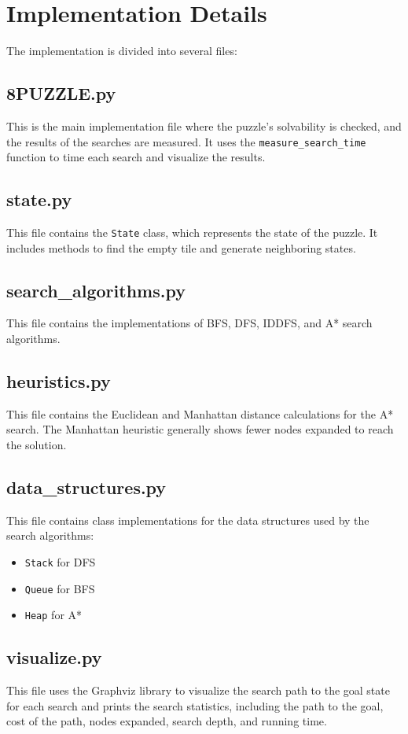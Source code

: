 \documentclass{article}
\begin{document}
\section{Implementation Details}
The implementation is divided into several files:

\subsection{8PUZZLE.py}
This is the main implementation file where the puzzle's solvability is checked, and the results of the searches are measured. It uses the \texttt{measure\_search\_time} function to time each search and visualize the results.

\subsection{state.py}
This file contains the \texttt{State} class, which represents the state of the puzzle. It includes methods to find the empty tile and generate neighboring states.

\subsection{search\_algorithms.py}
This file contains the implementations of BFS, DFS, IDDFS, and A* search algorithms.

\subsection{heuristics.py}
This file contains the Euclidean and Manhattan distance calculations for the A* search. The Manhattan heuristic generally shows fewer nodes expanded to reach the solution.

\subsection{data\_structures.py}
This file contains class implementations for the data structures used by the search algorithms:
\begin{itemize}
    \item \texttt{Stack} for DFS
    \item \texttt{Queue} for BFS
    \item \texttt{Heap} for A*
\end{itemize}

\subsection{visualize.py}
This file uses the Graphviz library to visualize the search path to the goal state for each search and prints the search statistics, including the path to the goal, cost of the path, nodes expanded, search depth, and running time.
\end{document}
